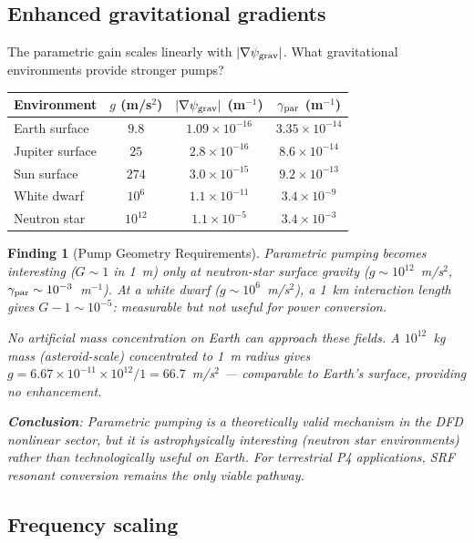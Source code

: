 \documentclass[11pt]{article}
\newtheorem{finding}{Finding}
\newcommand{\ee}[1]{\times 10^{#1}}
\newcommand{\psigrav}{\psi_{\rm grav}}
\begin{document}
\subsection{Enhanced gravitational gradients}

The parametric gain scales linearly with $|\nabla\psigrav|$. What
gravitational environments provide stronger pumps?

\begin{center}
\begin{tabular}{lccc}
\toprule
Environment & $g$ (m/s$^2$) & $|\nabla\psigrav|$ (m$^{-1}$)
  & $\gamma_{\rm par}$ (m$^{-1}$) \\
\midrule
Earth surface & $9.8$ & $1.09\ee{-16}$ & $3.35\ee{-14}$ \\
Jupiter surface & $25$ & $2.8\ee{-16}$ & $8.6\ee{-14}$ \\
Sun surface & $274$ & $3.0\ee{-15}$ & $9.2\ee{-13}$ \\
White dwarf & $10^6$ & $1.1\ee{-11}$ & $3.4\ee{-9}$ \\
Neutron star & $10^{12}$ & $1.1\ee{-5}$ & $3.4\ee{-3}$ \\
\bottomrule
\end{tabular}
\end{center}

\begin{finding}[Pump Geometry Requirements]
\label{find:pump-geometry}
Parametric pumping becomes interesting ($G \sim 1$ in 1~m) only at
neutron-star surface gravity ($g \sim 10^{12}$~m/s$^2$, $\gamma_{\rm par}
\sim 10^{-3}$~m$^{-1}$). At a white dwarf ($g \sim 10^6$~m/s$^2$),
a 1~km interaction length gives $G - 1 \sim 10^{-5}$: measurable but
not useful for power conversion.

No artificial mass concentration on Earth can approach these fields.
A $10^{12}$~kg mass (asteroid-scale) concentrated to 1~m radius gives
$g = 6.67\ee{-11}\times 10^{12}/1 = 66.7$~m/s$^2$ --- comparable to
Earth's surface, providing no enhancement.

\textbf{Conclusion}: Parametric pumping is a theoretically valid mechanism
in the DFD nonlinear sector, but it is astrophysically interesting
(neutron star environments) rather than technologically useful on Earth.
For terrestrial P4 applications, SRF resonant conversion remains the
only viable pathway.
\end{finding}

\subsection{Frequency scaling}
\end{document}
